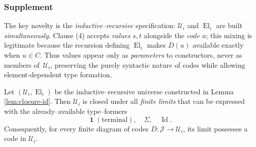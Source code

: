 \documentclass[a4paper,11pt]{article}
\newcommand{\El}{\operatorname{El}}          %
\begin{document}
\subsubsection*{Supplement}
The key novelty is the \emph{inductive–recursive} specification:
$\mathcal U_{i}$ and $\El_{i}$ are built \emph{simultaneously}.
Clause (4) accepts \emph{values} $s,t$ alongside the
\emph{code} $u$; this mixing is legitimate because the recursion
defining $\El_{i}$ makes $D(u)$ available exactly when $u\in C$.
Thus values appear only as \emph{parameters} to constructors, never as
members of~$\mathcal U_{i}$, preserving the purely syntactic nature of
codes while allowing element-dependent type formation.


\begin{lemma}\label{lem:closure-finite}
Let $(\mathcal U_{i},\El_{i})$ be the inductive–recursive universe
constructed in Lemma \ref{lem:closure-id}.
Then $\mathcal U_{i}$ is closed under all \emph{finite limits} that
can be expressed with the already–available type–formers
\[
  \mathbf 1\;(\text{terminal}),\quad
  \Sigma,\quad
  \operatorname{Id}.
\]
Consequently, for every finite diagram of codes
$D\colon\mathcal J\!\to\!\mathcal U_{i}$, its limit possesses a code
in $\mathcal U_{i}$.
\end{lemma}
\end{document}
